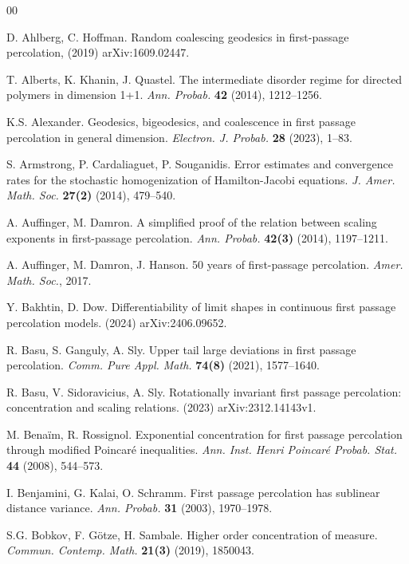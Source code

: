 \documentclass[reqno]{amsart}
\begin{document}
\begin{thebibliography}{00}

D. Ahlberg, C. Hoffman. Random coalescing geodesics in first-passage 
percolation, (2019) arXiv:1609.02447.

 T. Alberts, K. Khanin, J. Quastel. 
The intermediate disorder regime for directed polymers in dimension 1+1.
{\em Ann. Probab.} {\bf 42} (2014), 1212--1256.

 K.S. Alexander. Geodesics, bigeodesics, and 
coalescence in first passage percolation in general dimension. 
{\em Electron. J. Probab.} {\bf 28} (2023), 1--83.

 S. Armstrong, 
P. Cardaliaguet, P. Souganidis. Error estimates and convergence rates 
for the stochastic homogenization of Hamilton-Jacobi equations.
{\em J. Amer. Math. Soc.} {\bf 27(2)} (2014), 479--540.

 A. Auffinger, M. Damron. A simplified 
proof of the relation between scaling exponents in first-passage 
percolation. {\em Ann. Probab.} {\bf 42(3)} (2014), 1197--1211.

 A. Auffinger, M. Damron, J. Hanson.
50 years of first-passage percolation. {\em Amer. Math. Soc.}, 2017.

 Y. Bakhtin, D. Dow. Differentiability of limit 
shapes in continuous first passage percolation models. (2024) 
arXiv:2406.09652.

 R. Basu, S. Ganguly, A. Sly. Upper tail 
large deviations in first passage percolation. {\em Comm. Pure Appl. 
Math.} {\bf 74(8)} (2021), 1577--1640.

 R. Basu, V. Sidoravicius, A. Sly. 
Rotationally invariant first passage percolation: concentration and 
scaling relations. (2023) arXiv:2312.14143v1.

 M. Bena\"im, R. Rossignol. Exponential concentration 
for first passage percolation through modified Poincar\'e inequalities. 
{\em Ann. Inst. Henri Poincar\'e Probab. Stat.} {\bf 44} (2008), 
544--573.

 I. Benjamini, G. Kalai, O. Schramm. First 
passage percolation has sublinear distance variance. {\em Ann. Probab.} 
{\bf 31} (2003), 1970--1978.

 S.G. Bobkov, F. G\"otze, H. Sambale. 
Higher order concentration of measure. {\em Commun. Contemp. Math.} 
{\bf 21(3)} (2019), 1850043.


\end{thebibliography}
\end{document}

